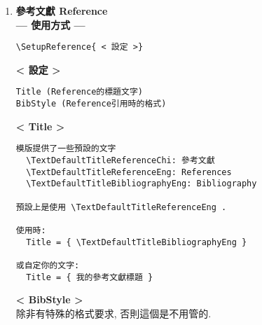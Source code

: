 \begin{enumerate}
{  \newpage
    效果:
  } %

  \newpage
  \item
  {
    \textbf{參考文獻 Reference}\\

    \textbf{--- 使用方式 ---}
    \begin{DescriptionFrame}
    \begin{verbatim}
\SetupReference{ < 設定 >}
    \end{verbatim}
    \end{DescriptionFrame}

    \textbf{< 設定 >}
    \begin{DescriptionFrame}
    \begin{verbatim}
Title (Reference的標題文字)
BibStyle (Reference引用時的格式)
    \end{verbatim}
    \end{DescriptionFrame}

    \textbf{< Title >}
    \begin{DescriptionFrame}
    \begin{verbatim}
模版提供了一些預設的文字
  \TextDefaultTitleReferenceChi: 參考文獻
  \TextDefaultTitleReferenceEng: References
  \TextDefaultTitleBibliographyEng: Bibliography

預設上是使用 \TextDefaultTitleReferenceEng .

使用時:
  Title = { \TextDefaultTitleBibliographyEng }

或自定你的文字:
  Title = { 我的參考文獻標題 }
    \end{verbatim}
    \end{DescriptionFrame}

  \newpage
    \textbf{< BibStyle >}\\
    除非有特殊的格式要求, 否則這個是不用管的.

}
\end{enumerate}
